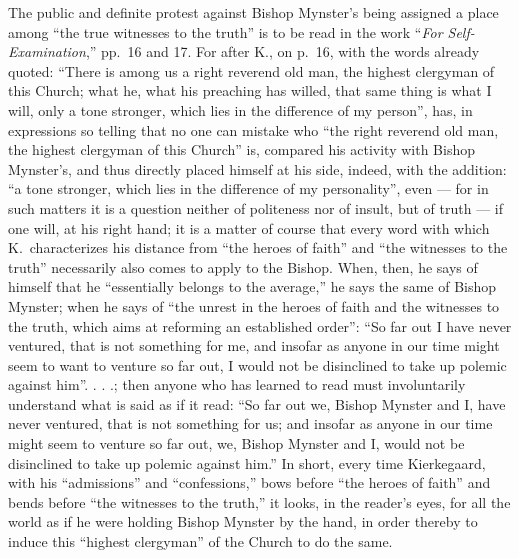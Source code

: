 \documentclass[12pt,a4paper]{article}
\newcommand{\opage}[1]{\marginnote{\footnotesize\textit{[#1]}}}
\begin{document}
The public and definite protest against Bishop Mynster's being assigned
a place among ``the true witnesses to the truth'' is to be read in
the work ``\emph{For Self-Examination},'' pp.~16 and 17. For after K.,
on p.~16, with the words already quoted: ``There is among us a right
reverend old man, the highest clergyman of this Church; what he, what
his preaching has willed, that same thing is what I will, only a tone
stronger, which lies in the difference of my person'', has, in
expressions so telling that no one can mistake who ``the right reverend
old man, the highest clergyman of this Church'' is, compared his
activity with Bishop Mynster's, and thus directly placed himself at his
side, indeed, with the addition: ``a tone stronger, which lies in the
difference of my personality'', even --- for in such matters it is a
question neither of politeness nor of insult, but of truth --- if one
will, at his right hand; it is a matter of course that every word with
which K.\ characterizes his distance from ``the heroes of faith'' and
``the witnesses to the truth'' necessarily also comes to apply to the
Bishop. When, then, he says of himself that he ``essentially belongs to
the average,'' he says the same of Bishop Mynster; when he says of ``the
unrest in the heroes of faith and the witnesses to the truth, which aims
at reforming an established order'': ``So far out I have never
ventured, that is not something for me, and insofar as anyone in our
time might seem to want to venture so far
\opage{19}out, I would not be disinclined to take up polemic against
him''. . . .; then anyone who has learned to read must involuntarily
understand what is said as if it read: ``So far out we, Bishop Mynster
and I, have never ventured, that is not something for us; and insofar as
anyone in our time might seem to venture so far out, we, Bishop Mynster
and I, would not be disinclined to take up polemic against him.'' In
short, every time Kierkegaard, with his ``admissions'' and
``confessions,'' bows before ``the heroes of faith'' and bends before
``the witnesses to the truth,'' it looks, in the reader's eyes, for all
the world as if he were holding Bishop Mynster by the hand, in order
thereby to induce this ``highest clergyman'' of the Church to do the
same.
\end{document}
